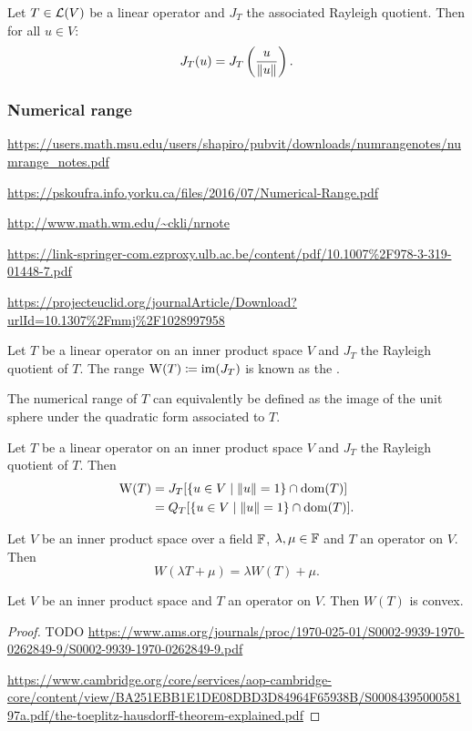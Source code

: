 \begin{lemma}
Let $T\in\operatorname{\mathcal{L}}(V)$ be a linear operator and $J_T$ the associated Rayleigh quotient. Then for all $u\in V$:
\[ J_T(u) = J_T\left(\frac{u}{\lVert u\rVert}\right). \]
\end{lemma}

\subsubsection{Numerical range}
\url{https://users.math.msu.edu/users/shapiro/pubvit/downloads/numrangenotes/numrange_notes.pdf}

\url{https://pskoufra.info.yorku.ca/files/2016/07/Numerical-Range.pdf}

\url{http://www.math.wm.edu/~ckli/nrnote}

\url{https://link-springer-com.ezproxy.ulb.ac.be/content/pdf/10.1007%2F978-3-319-01448-7.pdf}

\url{https://projecteuclid.org/journalArticle/Download?urlId=10.1307%2Fmmj%2F1028997958}

\begin{definition}
Let $T$ be a linear operator on an inner product space $V$ and $J_T$ the Rayleigh quotient of $T$. The range $\operatorname{W}(T) \coloneqq \operatorname{im}(J_T)$ is known as the .
\end{definition}

The numerical range of $T$ can equivalently be defined as the image of the unit sphere under the quadratic form associated to $T$.

\begin{lemma}
Let $T$ be a linear operator on an inner product space $V$ and $J_T$ the Rayleigh quotient of $T$. Then
\begin{align*}
\operatorname{W}(T) &= J_T[\left\{ u\in V \;\middle|\; \lVert u\rVert = 1 \right\} \cap \operatorname{dom}(T)] \\
&= Q_T[\left\{ u\in V \;\middle|\; \lVert u\rVert = 1 \right\}\cap \operatorname{dom}(T)].
\end{align*}
\end{lemma}

\begin{lemma}
Let $V$ be an inner product space over a field $\mathbb{F}$, $\lambda,\mu\in \mathbb{F}$ and $T$ an operator on $V$. Then
\[ W(\lambda T + \mu) = \lambda W(T) + \mu. \]
\end{lemma}

\begin{theorem}
Let $V$ be an inner product space and $T$ an operator on $V$. Then $W(T)$ is convex.
\end{theorem}
\begin{proof}
TODO \url{https://www.ams.org/journals/proc/1970-025-01/S0002-9939-1970-0262849-9/S0002-9939-1970-0262849-9.pdf}

\url{https://www.cambridge.org/core/services/aop-cambridge-core/content/view/BA251EBB1E1DE08DBD3D84964F65938B/S0008439500058197a.pdf/the-toeplitz-hausdorff-theorem-explained.pdf}
\end{proof}

